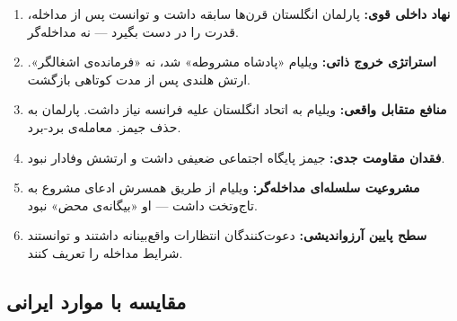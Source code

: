 \begin{tcolorbox}[successbox, title={عوامل موفقیت انقلاب شکوهمند}]
\begin{enumerate}[nosep, label=\textbf{\arabic*.}]
  \item \textbf{نهاد داخلی قوی:} پارلمان انگلستان قرن‌ها سابقه داشت و توانست پس از مداخله، قدرت را در دست بگیرد — نه مداخله‌گر.

  \item \textbf{استراتژی خروج ذاتی:} ویلیام «پادشاه مشروطه» شد، نه «فرمانده‌ی اشغالگر». ارتش هلندی پس از مدت کوتاهی بازگشت.

  \item \textbf{منافع متقابل واقعی:} ویلیام به اتحاد انگلستان علیه فرانسه نیاز داشت. پارلمان به حذف جیمز. معامله‌ی برد-برد.

  \item \textbf{فقدان مقاومت جدی:} جیمز پایگاه اجتماعی ضعیفی داشت و ارتشش وفادار نبود.

  \item \textbf{مشروعیت سلسله‌ای مداخله‌گر:} ویلیام از طریق همسرش ادعای مشروع به تاج‌وتخت داشت — او «بیگانه‌ی محض» نبود.

  \item \textbf{سطح پایین آرزواندیشی:} دعوت‌کنندگان انتظارات واقع‌بینانه داشتند و توانستند شرایط مداخله را تعریف کنند.
\end{enumerate}
\end{tcolorbox}

\subsection{مقایسه با موارد ایرانی}
\label{subsec:ch08-glorious-comparison}

